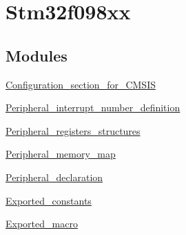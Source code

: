 \hypertarget{group__stm32f098xx}{}\section{Stm32f098xx}
\label{group__stm32f098xx}
\subsection*{Modules}
\begin{DoxyCompactItemize}
\item 
\hyperlink{group___configuration__section__for___c_m_s_i_s}{Configuration\+\_\+section\+\_\+for\+\_\+\+C\+M\+S\+IS}
\item 
\hyperlink{group___peripheral__interrupt__number__definition}{Peripheral\+\_\+interrupt\+\_\+number\+\_\+definition}
\item 
\hyperlink{group___peripheral__registers__structures}{Peripheral\+\_\+registers\+\_\+structures}
\item 
\hyperlink{group___peripheral__memory__map}{Peripheral\+\_\+memory\+\_\+map}
\item 
\hyperlink{group___peripheral__declaration}{Peripheral\+\_\+declaration}
\item 
\hyperlink{group___exported__constants}{Exported\+\_\+constants}
\item 
\hyperlink{group___exported__macro}{Exported\+\_\+macro}
\end{DoxyCompactItemize}
